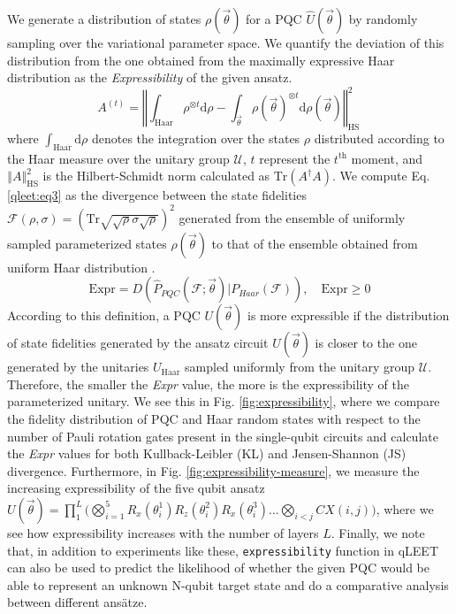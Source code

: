 We generate a distribution of states $\rho(\vec{\theta})$ for a PQC $\hat{U}(\vec{\theta})$ by randomly sampling over the variational parameter space. We quantify the deviation of this distribution from the one obtained from the maximally expressive Haar distribution as the \textit{Expressibility} of the given ansatz.
\begin{equation}\label{qleet:eq3}
    A^{(t)} =\left\Vert \int_\text{Haar}\rho^{\otimes t} \text{d}\rho - \int_{\vec{\theta}}\rho(\vec{\theta})^{\otimes t} \text{d}\rho(\vec{\theta}) \right\Vert_\text{HS}^2\,
\end{equation}
where $\int_\text{Haar}\text{d}\rho$ denotes the integration over the states $\rho$ distributed according to the Haar measure over the unitary group $\mathcal{U}$, $t$ represent the $t^{\text{th}}$ moment,  and $\left\Vert A \right\Vert_\text{HS}^2$ is the Hilbert-Schmidt norm calculated as $\text{Tr}(A^\dagger A)$. We compute Eq. \ref{qleet:eq3} as the divergence between the state fidelities $\mathcal{F}(\rho, \sigma) = \left(\text{Tr}\sqrt{\sqrt{\rho}\sigma\sqrt{\rho}} \right)^2$ \cite{Jozsa1994} generated from the ensemble of uniformly sampled parameterized states $\rho(\vec{\theta})$ to that of the ensemble obtained from uniform Haar distribution \cite{10.1002/qute.201900070}.
\begin{equation}
    \text{Expr} = D(\hat{P}_{PQC}(\mathcal{F}; \vec{\theta}) | P_{Haar}(\mathcal{F})), \quad \text{Expr} \geq 0
\end{equation}
According to this definition, a PQC $U(\vec{\theta})$ is more expressible if the distribution of state fidelities generated by the ansatz circuit $U(\vec{\theta})$ is closer to the one generated by the unitaries $U_{\text{Haar}}$ sampled uniformly from the unitary group $\mathcal{U}$. Therefore, the smaller the \textit{Expr} value, the more is the expressibility of the parameterized unitary. We see this in  Fig. \ref{fig:expressibility}, where we compare the fidelity distribution of PQC and Haar random states with respect to the number of Pauli rotation gates present in the single-qubit circuits and calculate the \textit{Expr} values for both Kullback-Leibler (KL) and Jensen-Shannon (JS) divergence. Furthermore, in Fig. \ref{fig:expressibility-measure}, we measure the increasing expressibility of the five qubit ansatz $U(\vec{\theta}) =  \prod_{1}^{L}\big(\bigotimes_{i=1}^{5}R_x(\theta_i^1)R_z(\theta_i^2)R_x(\theta_i^3) \ldots \bigotimes_{i<j}CX(i, j)\big)$, where we see how expressibility increases with the number of layers $L$.  Finally, we note that, in addition to experiments like these, \texttt{expressibility} function in qLEET can also be used to predict the likelihood of whether the given PQC would be able to represent an unknown N-qubit target state and do a comparative analysis between different ansätze.

